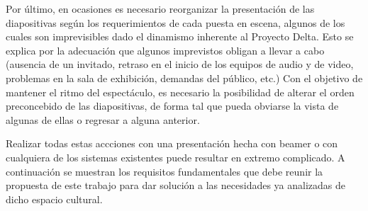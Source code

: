 			Por último, en ocasiones es necesario reorganizar la presentación de las diapositivas según los requerimientos de cada puesta en escena, algunos de los cuales son imprevisibles dado el dinamismo inherente al Proyecto Delta. Esto se explica por la adecuación que algunos imprevistos obligan a llevar a cabo (ausencia de un invitado, retraso en el inicio de los equipos de audio y de video, problemas en la sala de exhibición, demandas del público, etc.) Con el objetivo de mantener el ritmo del espectáculo, es necesario la posibilidad de alterar el orden preconcebido de las diapositivas, de forma tal que pueda obviarse la vista de algunas de ellas o regresar a alguna anterior.			

			Realizar todas estas accciones con una presentación hecha con beamer o con cualquiera de los sistemas existentes puede resultar en extremo complicado. A continuación se muestran los requisitos fundamentales que debe reunir la propuesta de este trabajo para dar solución a las necesidades ya analizadas de dicho espacio cultural. 


